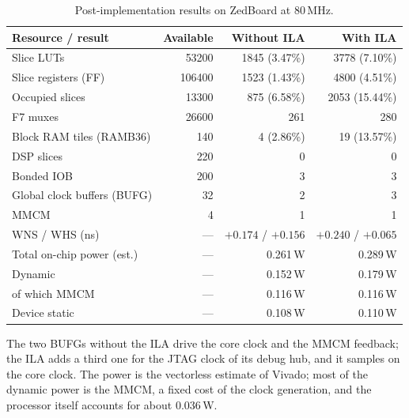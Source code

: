 \begin{table}[htbp]
\centering
\caption{Post-implementation results on ZedBoard at 80\,MHz.}
\label{tab:vivado-results}
\begin{tabularx}{\linewidth}{@{}X r r r@{}}
\toprule
Resource / result & Available & Without ILA & With ILA \\
\midrule
Slice LUTs                  & 53200  & 1845 (3.47\%) & 3778 (7.10\%) \\
Slice registers (FF)        & 106400 & 1523 (1.43\%) & 4800 (4.51\%) \\
Occupied slices             & 13300  & 875 (6.58\%)  & 2053 (15.44\%) \\
F7 muxes                    & 26600  & 261           & 280 \\
Block RAM tiles (RAMB36)    & 140    & 4 (2.86\%)    & 19 (13.57\%) \\
DSP slices                  & 220    & 0             & 0 \\
Bonded IOB                  & 200    & 3             & 3 \\
Global clock buffers (BUFG) & 32     & 2             & 3 \\
MMCM                        & 4      & 1             & 1 \\
\midrule
WNS / WHS (ns)              & ---    & $+0.174$ / $+0.156$ & $+0.240$ / $+0.065$ \\
Total on-chip power (est.)  & ---    & 0.261\,W      & 0.289\,W \\
\quad Dynamic               & ---    & 0.152\,W      & 0.179\,W \\
\quad\quad of which MMCM    & ---    & 0.116\,W      & 0.116\,W \\
\quad Device static         & ---    & 0.108\,W      & 0.110\,W \\
\bottomrule
\end{tabularx}
\end{table}

The two BUFGs without the ILA drive the core clock and the MMCM feedback; the
ILA adds a third one for the JTAG clock of its debug hub, and it samples on the
core clock. The power is the vectorless estimate of Vivado; most of the dynamic
power is the MMCM, a fixed cost of the clock generation, and the processor
itself accounts for about 0.036\,W.

